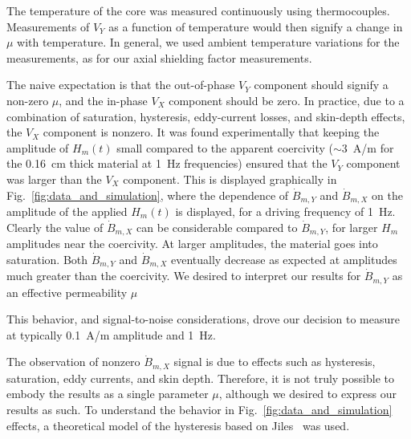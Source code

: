 The temperature of the core was measured continuously using
thermocouples.  Measurements of $V_Y$ as a function of temperature
would then signify a change in $\mu$ with temperature.  In general, we
used ambient temperature variations for the measurements, as for our
axial shielding factor measurements.


The naive expectation is that the out-of-phase $V_Y$ component should
signify a non-zero $\mu$, and the in-phase $V_X$ component should be
zero.  In practice, due to a combination of saturation, hysteresis,
eddy-current losses, and skin-depth effects, the $V_X$ component is
nonzero.  It was found experimentally that keeping the amplitude of
$H_m(t)$ small compared to the apparent coercivity ($\sim 3$~A/m for
the 0.16~cm thick material at 1~Hz frequencies) ensured that the $V_Y$
component was larger than the $V_X$ component.  This is displayed
graphically in Fig.~\ref{fig:data_and_simulation}, where the
dependence of $\dot{B}_{m,Y}$ and $\dot{B}_{m,X}$ on the amplitude of
the applied $H_m(t)$ is displayed, for a driving frequency of 1~Hz.
Clearly the value of $\dot{B}_{m,X}$ can be considerable compared to
$\dot{B}_{m,Y}$, for larger $H_m$ amplitudes near the coercivity.  At
larger amplitudes, the material goes into saturation.  Both
$\dot{B}_{m,Y}$ and $\dot{B}_{m,X}$ eventually decrease as expected at
amplitudes much greater than the coercivity.  We desired to interpret
our results for $\dot{B}_{m,Y}$ as an effective permeability $\mu$

This behavior, and
signal-to-noise considerations, drove our decision to measure at
typically 0.1~A/m amplitude and 1~Hz.

The observation of nonzero $\dot{B}_{m,X}$ signal is due to effects
such as hysteresis, saturation, eddy currents, and skin depth.
Therefore, it is not truly possible to embody the results as a single
parameter $\mu$, although we desired to express our results as such.
To understand the behavior in Fig.~\ref{fig:data_and_simulation}
effects, a theoretical model of the hysteresis based on
Jiles~\cite{bib:jiles} was used.

